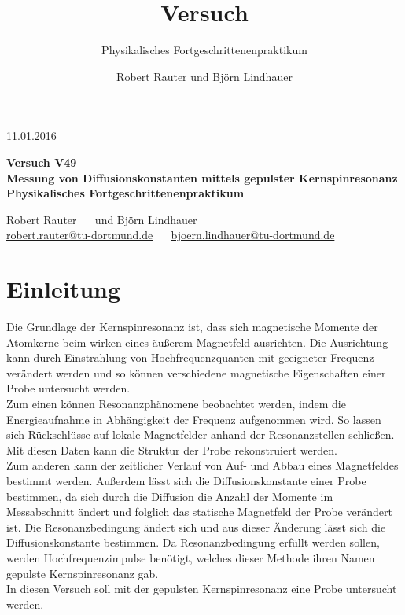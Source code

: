 \documentclass[]{scrartcl}
\title{Versuch \versuchnummer\\ \versuchname}
\subtitle{Physikalisches Fortgeschrittenenpraktikum}
\author{Robert Rauter und Björn Lindhauer}
\date{\versuchdatum}
\newcommand{\versuchnummer}{V49}
\newcommand{\versuchname}{Messung von Diffusionskonstanten mittels gepulster Kernspinresonanz}
\newcommand{\versuchdatum}{11.01.2016}
\begin{document}
\begin{titlepage}
{\large \versuchdatum}
\vspace{7cm}
\begin{center}
\textbf{\huge Versuch \versuchnummer}\\
\vspace{0.5cm}
\textbf{\huge \versuchname}\\
\vspace{0.2cm}
\textbf{ Physikalisches Fortgeschrittenenpraktikum}\\
\vspace{9cm}

{\Large Robert Rauter \ \ \hspace{1.5cm} und \hspace{1.5cm} Björn Lindhauer}\\
{ \url{robert.rauter@tu-dortmund.de} \ \ \hspace{2cm} \url{bjoern.lindhauer@tu-dortmund.de}}
\end{center}
\end{titlepage}
\section{Einleitung}
Die Grundlage der Kernspinresonanz ist, dass sich magnetische Momente der Atomkerne beim wirken eines äußerem Magnetfeld ausrichten. Die Ausrichtung kann durch Einstrahlung von Hochfrequenzquanten mit geeigneter Frequenz verändert werden und so können verschiedene magnetische Eigenschaften einer Probe untersucht werden.\\
Zum einen können Resonanzphänomene beobachtet werden, indem die Energieaufnahme in Abhängigkeit der Frequenz aufgenommen wird. So lassen sich Rückschlüsse auf lokale Magnetfelder anhand der Resonanzstellen schließen. Mit diesen Daten kann die Struktur der Probe rekonstruiert werden.\\
Zum anderen kann der zeitlicher Verlauf von Auf- und Abbau eines Magnetfeldes bestimmt werden. Außerdem lässt sich die Diffusionskonstante einer Probe bestimmen, da sich durch die Diffusion die Anzahl der Momente im Messabschnitt ändert und folglich das statische Magnetfeld der Probe verändert ist. Die Resonanzbedingung ändert sich und aus dieser Änderung lässt sich die Diffusionskonstante bestimmen. Da Resonanzbedingung erfüllt werden sollen, werden Hochfrequenzimpulse benötigt, welches dieser Methode ihren Namen gepulste Kernspinresonanz gab.\\
In diesen Versuch soll mit der gepulsten Kernspinresonanz eine Probe untersucht werden.
\end{document}
